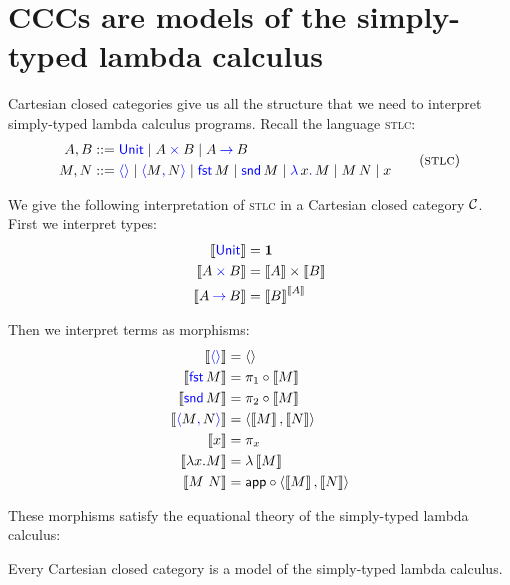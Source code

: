 \section{CCCs are models of the simply-typed lambda calculus}
Cartesian closed categories give us all the structure that we need to interpret
simply-typed lambda calculus programs. Recall the language \textsc{stlc}:
\begin{gather}
  \begin{aligned}
   A,B &::= \plkw{Unit}
     \mid A \pltimes B
     \mid A \plto B
  \\
  M,N &::= \plunit{}
      \mid \plpair{M}{N}
      \mid \plfst{M}
      \mid \plsnd{M}
      \mid \pllam{x}{M}
      \mid \plapp{M}{N}
      \mid x
  \end{aligned}
  \tag{\textsc{stlc}}
\end{gather}

We give the following interpretation of \textsc{stlc} 
in a Cartesian closed category $\mathcal C$. 
First we interpret types:
\begin{align*}
  \left\llbracket \mathsf{{\color{blue}Unit}} \right\rrbracket &= \mathbf{1} \\ 
  \left\llbracket A \mathbin{{\color{blue}\times}} B \right\rrbracket &= \left\llbracket A \right\rrbracket \times \left\llbracket B \right\rrbracket \\ 
  \left\llbracket A \mathbin{{\color{blue}\to}} B \right\rrbracket &= \left\llbracket B \right\rrbracket^{\left\llbracket A \right\rrbracket}
\end{align*}

Then we interpret terms as morphisms:
    \begin{align*}
    \llbr{\plunit} &= \angled{} \\
    \llbr{\plfst{M}} &= \pi_1 \circ \llbr{M} \\
    \llbr{\plsnd{M}} &= \pi_2 \circ \llbr{M} \\
    \llbr{\plpair{M}{N}} &= \angled{\llbr{M},\llbr{N}} \\
    \llbr{x} &= \pi_x \\
    \llbr{\lambda x . M} &= \lambda \dbracket{M} \\ 
    \llbr{M~N} &= \app \circ \langle \dbracket{M}, \dbracket{N} \rangle
  \end{align*}

These morphisms satisfy the equational theory of the simply-typed 
lambda calculus:
\begin{theorem} \label{thm:cccs}
  Every Cartesian closed category is a
  model of the simply-typed
  lambda calculus.
\end{theorem}


